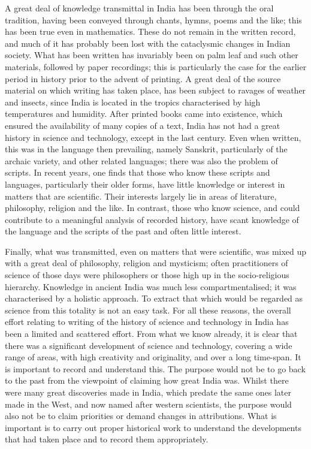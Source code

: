A great deal of knowledge transmittal in India has been through the oral tradition, having been conveyed through chants, hymns, poems and the like; this has been true even in mathematics. These do not remain in the written record, and much of it has probably been lost with the cataclysmic changes in Indian society.
What has been written has invariably been on palm leaf and such other materials, followed by paper recordings; this is particularly the case for the earlier period in history prior to the advent of printing. A great deal of the source material on which writing has taken place, has been subject to ravages of weather and insects, since India is located in the tropics characterised by high temperatures and humidity. After printed books came into existence, which ensured the availability of many copies of a text, India has not had a great history in science and technology, except in the last century.
Even when written, this was in the language then prevailing, namely Sanskrit, particularly of the archaic variety, and other related languages; there was also the problem of scripts. In recent years, one finds that those who know these scripts and languages, particularly their older forms, have little knowledge or interest in matters that are scientific. Their interests largely lie in areas of literature, philosophy, religion and the like. In contrast, those who know science, and could contribute to a meaningful analysis of recorded history, have scant knowledge of the language and the scripts of the past and often little interest.

Finally, what was transmitted, even on matters that were scientific, was mixed up with a great deal of philosophy, religion and mysticism; often practitioners of science of those days were philosophers or those high up in the socio-religious hierarchy. Knowledge in ancient India was much less compartmentalised; it was characterised by a holistic approach. To extract that which would be regarded as science from this totality is not an easy task.
For all these reasons, the overall effort relating to writing of the history of science and technology in India has been a limited and scattered effort.
From what we know already, it is clear that there was a significant development of science and technology, covering a wide range of areas, with high creativity and originality, and over a long time-span. It is important to record and understand this. The purpose would not be to go back to the past from the viewpoint of claiming how great India was. Whilst there were many great discoveries made in India, which predate the same ones later made in the West, and now named after western scientists, the purpose would also not be to claim priorities or demand changes in attributions. What is important is to carry out proper historical work to understand the developments that had taken place and to record them appropriately.

